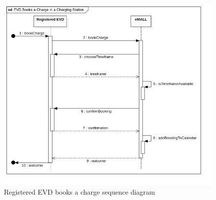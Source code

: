 \begin{center}
    \begin{figure} [H]
        \begin{center}
            \includegraphics[width=0.9\linewidth]{Images/SequenceDiagrams/evd_books_a_charge_in_a_charging_station}
            \caption{Registered EVD books a charge sequence diagram}
            \label{fig: evd_books_charge_seq_diag}
        \end{center}
    \end{figure}
\end{center}

\newpage

